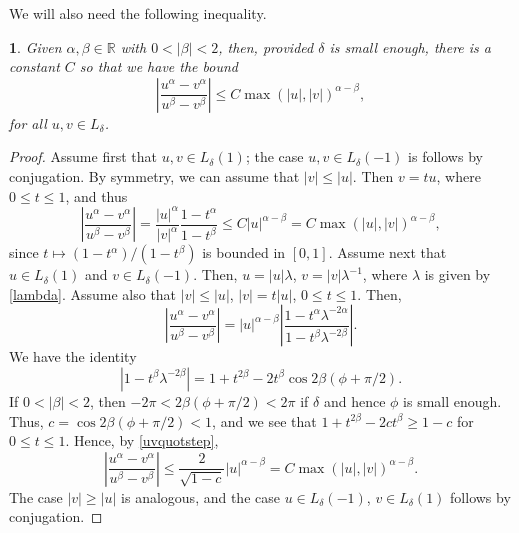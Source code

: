 \documentclass{article}
\numberwithin{equation}{section}
\numberwithin{figure}{section}
\theoremstyle{plain}
\theoremstyle{plain}
\newtheorem{lemma}[thm]{\protect\lemmaname}
\numberwithin{thm}{section}
\theoremstyle{remark}
\providecommand{\lemmaname}{Lemma}
\newcommand{\R}{\mathbb{R}}
\let \le \leqslant
\let \ge \geqslant
\begin{document}
We will also need the following inequality.

\begin{lemma}\label{Lem:uvquot}
Given $\alpha,\beta\in\R$ with $0<|\beta|<2$, then, provided $\delta$ is small enough, there is a constant $C$ so that
we have the bound
\begin{equation}\label{uvquot}
\left|\frac{u^\alpha-v^\alpha}{u^\beta-v^\beta}\right|\le C\max(|u|, |v|)^{\alpha-\beta},
\end{equation}
for all $u,v\in L_\delta$.
\end{lemma}

\begin{proof}
Assume first that $u,v\in L_\delta(1)$; the case $u,v\in L_\delta(-1)$ is follows by conjugation. By symmetry, we can assume that $|v|\le |u|$. Then $v=tu$, where
$0\le t\le 1$, and thus
\begin{equation*}
\left|\frac{u^\alpha-v^\alpha}{u^\beta-v^\beta}\right|=\frac{|u|^\alpha}{|v|^\alpha}\frac{1-t^\alpha}{1-t^\beta}\le C|u|^{\alpha-\beta}=C\max(|u|, |v|)^{\alpha-\beta},
\end{equation*}
since $t\mapsto (1-t^\alpha)/(1-t^\beta)$ is bounded in $[0,1]$. Assume next that $u\in L_\delta(1)$ and $v\in L_\delta(-1)$. Then, $u=|u|\lambda$, $v=|v|\lambda^{-1}$,
where $\lambda$ is given by \eqref{lambda}. Assume also that $|v|\le |u|$, $|v|=t|u|$, $0\le t\le 1$. Then,
\begin{equation}\label{uvquotstep}
\left|\frac{u^\alpha-v^\alpha}{u^\beta-v^\beta}\right|=|u|^{\alpha-\beta}\left|\frac{1-t^\alpha\lambda^{-2\alpha}}{1-t^\beta\lambda^{-2\beta}}\right|.
\end{equation}
We have the identity
\begin{equation*}
|1-t^\beta\lambda^{-2\beta}|=1+t^{2\beta}-2t^\beta\cos2\beta(\phi+\pi/2).
\end{equation*}
If $0<|\beta|<2$, then $-2\pi<2\beta(\phi+\pi/2)<2\pi$ if $\delta$ and hence $\phi$ is small enough. Thus, $c=\cos2\beta(\phi+\pi/2)<1$, and we see that
$1+t^{2\beta}-2ct^\beta\ge 1-c$ for $0\le t\le 1$. Hence, by \eqref{uvquotstep},
\begin{equation*}
\left|\frac{u^\alpha-v^\alpha}{u^\beta-v^\beta}\right|\le \frac{2}{\sqrt{1-c}}|u|^{\alpha-\beta}=C\max(|u|, |v|)^{\alpha-\beta}.
\end{equation*}
The case $|v|\ge |u|$ is analogous, and the case $u\in L_\delta(-1)$, $v\in L_\delta(1)$ follows by conjugation.
\end{proof}
\end{document}
